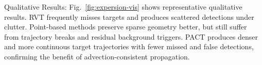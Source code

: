 \documentclass[runningheads]{llncs}
\begin{document}
Qualitative Results: Fig.~\ref{fig:expersion-vis} shows representative qualitative results.
RVT frequently misses targets and produces scattered detections under clutter.
Point-based methods preserve sparse geometry better, but still suffer from trajectory breaks and residual background triggers.
PACT produces denser and more continuous target trajectories with fewer missed and false detections, confirming the benefit of advection-consistent propagation.
\end{document}
